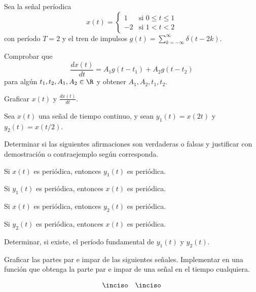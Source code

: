\begin{ejercicio}
    Sea la señal períodica
    \begin{equation*}
        x(t) = \begin{cases}
            1 & \mbox{si } 0 \leq t \leq 1 \\
            -2 & \mbox{si } 1 < t < 2 
        \end{cases}
    \end{equation*}
    con período $T=2$ y el tren de impulsos $g(t) = \sum_{k=-\infty}^{\infty} \delta(t-2k)$. 
    
    \inciso Comprobar que
    \begin{equation*}
        \frac{dx(t)}{dt} = A_1 g(t-t_1) + A_2 g(t-t_2)
    \end{equation*}
    para algún $t_1, t_2, A_1, A_2 \in \R$ y obtener $A_1, A_2, t_1, t_2$.

    \inciso Graficar $x(t)$ y $\frac{dx(t)}{dt}$.   
\end{ejercicio}


\begin{ejercicio}
    Sea $x(t)$ una señal de tiempo continuo, y sean $y_1(t) = x(2 t)$ y $y_2(t) = x(t / 2)$. 
    
    \inciso Determinar si las siguientes afirmaciones son verdaderas o falsas y justificar con demostración o contraejemplo según corresponda.

    \vspace*{1.5ex}
    
    \hspace*{0.1em} \subinciso Si $x(t)$ es periódica, entonces $y_1(t)$ es periódica.
    
    \hspace*{0.1em} \subinciso Si $y_1(t)$ es periódica, entonces $x(t)$ es periódica.
    
    \hspace*{0.1em} \subinciso Si $x(t)$ es periódica, entonces $y_2(t)$ es periódica.
    
    \hspace*{0.1em} \subinciso Si $y_2(t)$ es periódica, entonces $x(t)$ es periódica.

    \inciso Determinar, si existe, el período fundamental de $y_1(t)$ y $y_2(t)$.
    
\end{ejercicio}

\begin{ejercicio}
    Graficar las partes par e impar de las siguientes señales. Implementar en \Keyboardsym una función que obtenga la parte par e impar de una señal en el tiempo cualquiera. 
    
    \begin{align*}
    \inciso \parbox{.3\textwidth}{} & \hfill & \inciso \parbox{.3\textwidth}{}
    \end{align*}
\end{ejercicio}


